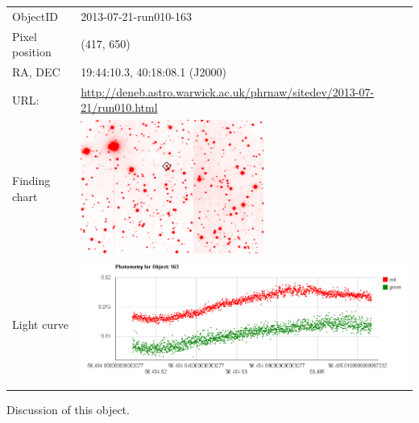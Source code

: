   \begin{tabular}{l l}
  \hline
  ObjectID & 2013-07-21-run010-163 \\
  Pixel position & (417, 650) \\
  RA, DEC & 19:44:10.3, 40:18:08.1 (J2000) \\
  URL: & \small \url{http://deneb.astro.warwick.ac.uk/phrnaw/sitedev/2013-07-21/run010.html} \\
  Finding chart & \includegraphics[width=60mm]{images/2013-07-21-run010-163.png} \\
  Light curve & \includegraphics[width=120mm]{images/2013-07-21-run010-163_lightcurve.png} \\
  \hline
  \end{tabular}
  Discussion of this object.

